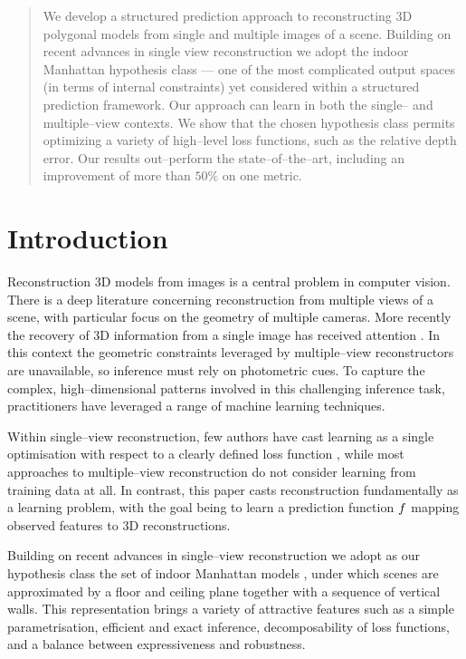 \begin{abstract}
  We develop a structured prediction approach to reconstructing 3D
  polygonal models from single and multiple images of a
  scene. Building on recent advances in single view reconstruction we
  adopt the indoor Manhattan hypothesis class --- one of the most
  complicated output spaces (in terms of internal constraints) yet
  considered within a structured prediction framework. Our approach
  can learn in both the single-- and multiple--view contexts. We
  show that the chosen hypothesis class permits optimizing a variety
  of high--level loss functions, such as the relative depth error. Our
  results out--perform the state--of--the--art, including an
  improvement of more than $50\%$ on one metric.
\end{abstract}

\section{Introduction}
\label{sec:introduction}

Reconstruction 3D models from images is a central problem in computer
vision. There is a deep literature concerning reconstruction from
multiple views of a scene, with particular focus on the geometry of
multiple cameras. More recently the recovery of 3D information from a
single image has received attention \cite{Hoiem05,Saxena09}. In this
context the geometric constraints leveraged by multiple--view
reconstructors are unavailable, so inference must rely on photometric
cues. To capture the complex, high--dimensional patterns involved in
this challenging inference task, practitioners have leveraged a range
of machine learning techniques.

Within single--view reconstruction, few authors have cast learning as
a single optimisation with respect to a clearly defined loss function
\cite{Hoiem05,Saxena09,Lee09,Flint11}, while most approaches to
multiple--view reconstruction do not consider learning from training
data at all. In contrast, this paper casts reconstruction
fundamentally as a learning problem, with the goal being to learn a
prediction function $f$ mapping observed features to 3D
reconstructions.

Building on recent advances in single--view reconstruction we adopt as
our hypothesis class the set of indoor Manhattan models
\cite{Lee09,Flint10eccv,Flint11}, under which scenes are approximated
by a floor and ceiling plane together with a sequence of vertical
walls. This representation brings a variety of attractive features
such as a simple parametrisation, efficient and exact inference,
decomposability of loss functions, and a balance between
expressiveness and robustness.

